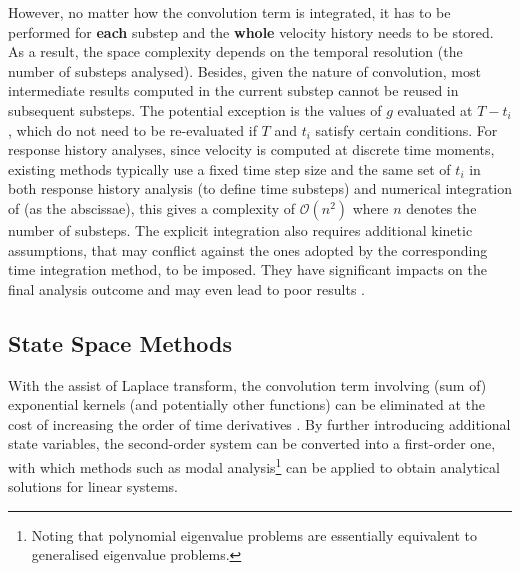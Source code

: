 However, no matter how the convolution term is integrated, it has to be performed for \textbf{each} substep and the \textbf{whole} velocity history needs to be stored. As a result, the space complexity depends on the temporal resolution (the number of substeps analysed). Besides, given the nature of convolution, most intermediate results computed in the current substep cannot be reused in subsequent substeps. The potential exception is the values of $g$ evaluated at $T-t_i$, which do not need to be re-evaluated if $T$ and $t_i$ satisfy certain conditions. For response history analyses, since velocity is computed at discrete time moments, existing methods typically use a fixed time step size and the same set of $t_i$ in both response history analysis (to define time substeps) and numerical integration of  (as the abscissae), this gives a complexity of $\mathcal{O}\left(n^2\right)$ where $n$ denotes the number of substeps. The explicit integration also requires additional kinetic assumptions, that may conflict against the ones adopted by the corresponding time integration method, to be imposed. They have significant impacts on the final analysis outcome \citep[see,][]{Liu2014} and may even lead to poor results \cite[see,][Figs. 12, 17, 25, 26]{Liu2023}.
\subsection{State Space Methods}
With the assist of Laplace transform, the convolution term involving (sum of) exponential kernels (and potentially other functions) can be eliminated at the cost of increasing the order of time derivatives \citep[see, e.g.,][]{Wu2019}. By further introducing additional state variables, the second-order system  can be converted into a first-order one, with which methods such as modal analysis\footnote{Noting that polynomial eigenvalue problems are essentially equivalent to generalised eigenvalue problems.} can be applied to obtain analytical solutions for linear systems.


